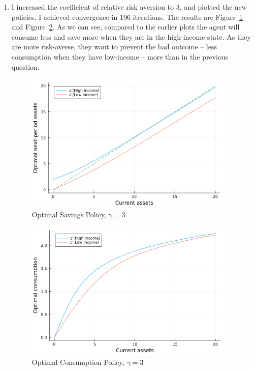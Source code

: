 \documentclass[10pt]{article}
\begin{document}
\begin{enumerate}
	\item I increased the coefficient of relative risk aversion to 3, and plotted the new policies. I achieved convergence in 196 iterations. The results are Figure~\ref{fig3} and Figure~\ref{fig4}. As we can see, compared to the earlier plots the agent will consume less and save more when they are in the high-income state. As they are more risk-averse, they want to prevent the bad outcome -- less consumption when they have low-income -- more than in the previous question.\begin{figure}[H] \centering \includegraphics[width=10cm]{macro_hw4_code/savings_policy_function2.png}\caption{Optimal Savings Policy, $\gamma=3$}\label{fig3}\end{figure}\begin{figure}[H] \centering \includegraphics[width=10cm]{macro_hw4_code/consumption_policy_function2.png}\caption{Optimal Consumption Policy, $\gamma = 3$}\label{fig4}\end{figure}\newpage

\end{enumerate}
\end{document}
